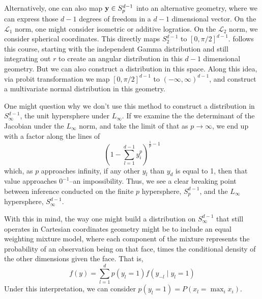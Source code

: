 Alternatively, one can also map ${\bf y}\in S_{p}^{d-1}$ into an alternative geometry, where we
  can express those $d-1$ degrees of freedom in a $d-1$ dimensional vector.  On the $\mathcal{L}_1$
  norm, one might consider isometric or additive logratios\cite{aitchison1982}.  On the
  $\mathcal{L}_2$ norm, we consider spherical coordinates.  This directly maps $S_2^{d-1}$ to
  $[0,\pi/2]^{d-1}$. \cite{nunez2019} follows this course, starting with the independent Gamma
  distribution and still integrating out $r$ to create an angular distribution in this $d-1$
  dimensional geometry.  But we can also construct a distribution in this space.  Along this idea,
  via probit transformation we map $[0,\pi/2]^{d-1}$ to $(-\infty, \infty)^{d-1}$, and construct
  a multivariate normal distribution in this geometry.

One might question why we don't use this method to construct a distribution in $S_{\infty}^{d-1}$,
  the unit hypersphere under $L_{\infty}$.  If we examine the the determinant of the Jacobian under
  the $L_{\infty}$ norm, and take the limit of that as $p\to\infty$, we end up with a factor along
  the lines of
  \begin{equation*}
    \left(1 - \sum_{l = 1}^{d-1}y_i^p\right)^{\frac{1}{p} - 1}
  \end{equation*}
  which, as $p$ approaches infinity, if any other $y_l$ than $y_d$ is equal to 1, then that value
  approaches $0^{-1}$--an impossibility.  Thus, we see a clear breaking point between inference
  conducted on the finite $p$ hypersphere, $S_{p}^{d-1}$, and the $L_{\infty}$ hypersphere,
  $S_{\infty}^{d-1}$. 

With this in mind, the way one might build a distribution on $S_{\infty}^{d-1}$ that still operates
  in Cartesian coordinates geometry might be to include an equal weighting mixture model, where each
  component of the mixture represents the probability of an observation being on that face, times
  the conditional density of the other dimensions given the face.  That is,
  \begin{equation*}
    f(y) = \sum_{l = 1}^{d}p(y_l = 1)f(y_{-l}\mid y_l = 1)
  \end{equation*}
  Under this interpretation, we can consider $p(y_l = 1) = P(x_l = \max_i x_i)$.

